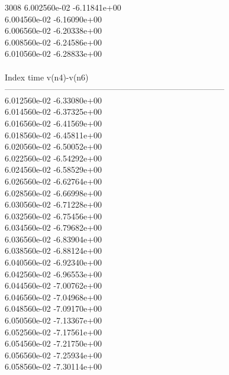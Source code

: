 3008	6.002560e-02	-6.11841e+00	\\ 	6.004560e-02	-6.16090e+00	\\ 	6.006560e-02	-6.20338e+00	\\ 	6.008560e-02	-6.24586e+00	\\ 	6.010560e-02	-6.28833e+00	\\ \hline
\\ \hline
Index   time            v(n4)-v(n6)     \\ \hline
--------------------------------------------------------------------------------\\ 	6.012560e-02	-6.33080e+00	\\ 	6.014560e-02	-6.37325e+00	\\ 	6.016560e-02	-6.41569e+00	\\ 	6.018560e-02	-6.45811e+00	\\ 	6.020560e-02	-6.50052e+00	\\ 	6.022560e-02	-6.54292e+00	\\ 	6.024560e-02	-6.58529e+00	\\ 	6.026560e-02	-6.62764e+00	\\ 	6.028560e-02	-6.66998e+00	\\ 	6.030560e-02	-6.71228e+00	\\ 	6.032560e-02	-6.75456e+00	\\ 	6.034560e-02	-6.79682e+00	\\ 	6.036560e-02	-6.83904e+00	\\ 	6.038560e-02	-6.88124e+00	\\ 	6.040560e-02	-6.92340e+00	\\ 	6.042560e-02	-6.96553e+00	\\ 	6.044560e-02	-7.00762e+00	\\ 	6.046560e-02	-7.04968e+00	\\ 	6.048560e-02	-7.09170e+00	\\ 	6.050560e-02	-7.13367e+00	\\ 	6.052560e-02	-7.17561e+00	\\ 	6.054560e-02	-7.21750e+00	\\ 	6.056560e-02	-7.25934e+00	\\ 	6.058560e-02	-7.30114e+00	\\ \hline
